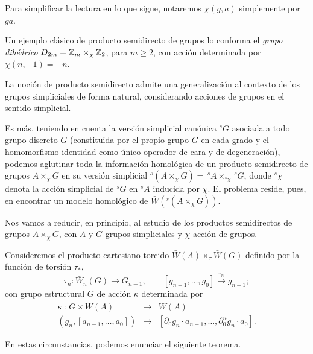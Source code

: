 Para simplificar la lectura
en lo que sigue, notaremos $\chi (g,a)$ simplemente por $ga$.

Un ejemplo cl\'{a}sico de producto semidirecto de grupos lo conforma
el {\em grupo dih\'{e}drico} $D_{2m}= {\Bbb Z} _m \times _\chi {\Bbb Z} _2$, para
$m \geq 2$, con acci\'{o}n determinada por $\chi (n,-1)=-n$.

La noci\'{o}n de producto semidirecto admite una generalizaci\'{o}n al
contexto de los grupos simpliciales de forma natural, considerando
acciones de grupos en el sentido simplicial.

Es m\'{a}s, teniendo en cuenta la versi\'{o}n simplicial can\'{o}nica
$^sG$ asociada a todo grupo discreto $G$ (constituida por el
propio grupo $G$ en cada grado y el homomorfismo identidad como
\'{u}nico operador de cara y de degeneraci\'{o}n), podemos aglutinar
toda la informaci\'{o}n homol\'{o}gica de un producto semidirecto de
grupos $A \times _\chi G$ en su versi\'{o}n simplicial $^s(A \times
_\chi G)=\,^sA \times _{^s \chi} \, ^sG$, donde $^s \chi$ denota la
acci\'{o}n simplicial de $^sG$ en $^sA$ inducida por $\chi$. El problema
reside, pues, en encontrar un modelo homol\'{o}gico de $\bar{W}(^s(A \times
_\chi G))$.

Nos vamos a reducir, en principio, al estudio de los productos
semidirectos de grupos $A \times _\chi G$, con $A$ y $G$ grupos
simpliciales y $\chi$ acci\'{o}n de grupos.

Consideremos el producto cartesiano torcido $\bar{W}(A) \times _
\tau \bar{W}(G)$ definido por la funci\'{o}n de torsi\'{o}n $\tau_*$,
$$\tau _n: \bar{W}_n(G) \rightarrow G_{n-1}, \qquad [g_{n-1},
\ldots ,g_0] \stackrel{\tau _n}{\mapsto} g_{n-1};$$ con grupo
estructural $G$ de acci\'{o}n $\kappa$ determinada por
$$\begin{array}{ccc} \kappa\,:\,G\times \bar{W}(A) &
\longrightarrow & \bar{W}(A) \\ (g_n,[a_{n-1},\ldots,a_0]) &
\longrightarrow & [\partial _0g_n \cdot a_{n-1},\ldots, \partial _0^ng_n
\cdot a_0].
\end{array}$$

En estas circunstancias, podemos enunciar el siguiente teorema.

